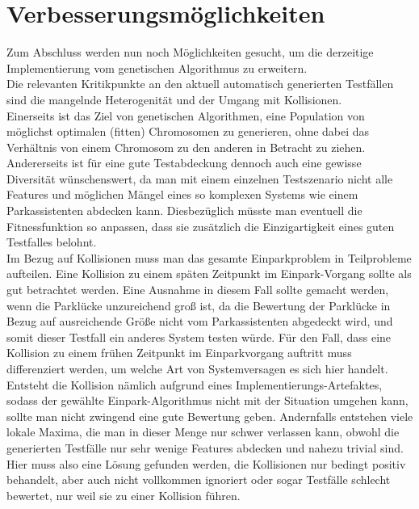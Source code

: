\documentclass[12pt,a4paper]{article}
\begin{document}
\section{Verbesserungsmöglichkeiten}
Zum Abschluss werden nun noch Möglichkeiten gesucht, um die derzeitige Implementierung vom genetischen Algorithmus zu erweitern.\\
Die relevanten Kritikpunkte an den aktuell automatisch generierten Testfällen sind die mangelnde Heterogenität und der Umgang mit Kollisionen.\\
Einerseits ist das Ziel von genetischen Algorithmen, eine Population von möglichst optimalen (fitten) Chromosomen zu generieren, ohne dabei das Verhältnis von einem Chromosom zu den anderen in Betracht zu ziehen. Andererseits ist für eine gute Testabdeckung dennoch auch eine gewisse Diversität wünschenswert, da man mit einem einzelnen Testszenario nicht alle Features und möglichen Mängel eines so komplexen Systems wie einem Parkassistenten abdecken kann. Diesbezüglich müsste man eventuell die Fitnessfunktion so anpassen, dass sie zusätzlich die Einzigartigkeit eines guten Testfalles belohnt.\\
Im Bezug auf Kollisionen muss man das gesamte Einparkproblem in Teilprobleme aufteilen. Eine Kollision zu einem späten Zeitpunkt im Einpark-Vorgang sollte als gut betrachtet werden. Eine Ausnahme in diesem Fall sollte gemacht werden, wenn die Parklücke unzureichend groß ist, da die Bewertung der Parklücke in Bezug auf ausreichende Größe nicht vom Parkassistenten abgedeckt wird, und somit dieser Testfall ein anderes System testen würde. Für den Fall, dass eine Kollision zu einem frühen Zeitpunkt im Einparkvorgang auftritt muss differenziert werden, um welche Art von Systemversagen es sich hier handelt. Entsteht die Kollision nämlich aufgrund eines Implementierungs-Artefaktes, sodass der gewählte Einpark-Algorithmus nicht mit der Situation umgehen kann, sollte man nicht zwingend eine gute Bewertung geben. Andernfalls entstehen viele lokale Maxima, die man in dieser Menge nur schwer verlassen kann, obwohl die generierten Testfälle nur sehr wenige Features abdecken und nahezu trivial sind. Hier muss also eine Lösung gefunden werden, die Kollisionen nur bedingt positiv behandelt, aber auch nicht vollkommen ignoriert oder sogar Testfälle schlecht bewertet, nur weil sie zu einer Kollision führen.
\end{document}
